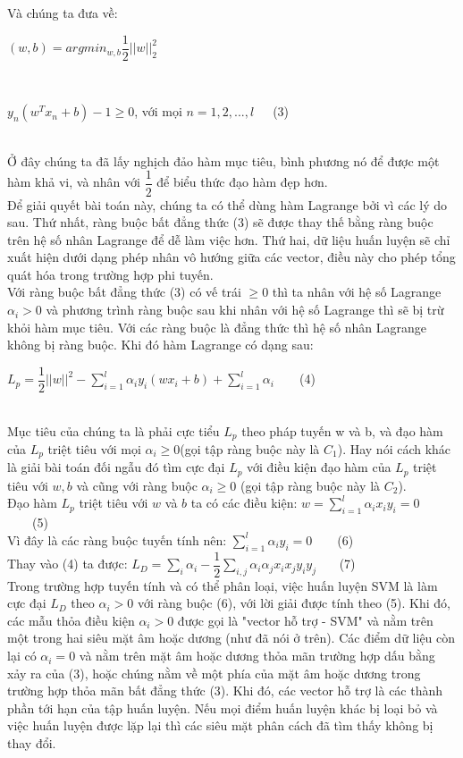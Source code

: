 \documentclass[12pt,a4paper]{article}
\begin{document}
Và chúng ta đưa về:\\
\centerline{$(w,b)=argmin_{w,b}\dfrac{1}{2}||w||^2_2$}\\
\centerline{$y_n(w^Tx_n+b) -1 \geq 0$, với mọi $n=1,2,...,l$\ \ \ (3)}\\
\indent Ở đây chúng ta đã lấy nghịch đảo hàm mục tiêu, bình phương nó để được một hàm khả vi, và nhân với $\dfrac{1}{2}$ để biểu thức đạo hàm đẹp hơn.\\
\indent Để giải quyết bài toán này, chúng ta có thể dùng hàm Lagrange bởi vì các lý do sau. Thứ nhất, ràng buộc bất đẳng thức (3) sẽ được thay thế bằng ràng buộc trên hệ số nhân Lagrange để dễ làm việc hơn. Thứ hai, dữ liệu huấn luyện sẽ chỉ xuất hiện dưới dạng phép nhân vô hướng giữa các vector, điều này cho phép tổng quát hóa trong trường hợp phi tuyến.\\
Với ràng buộc bất đẳng thức (3) có vế trái $\geq 0 $ thì ta nhân với hệ số Lagrange $\alpha_i > 0$ và phương trình ràng buộc sau khi nhân với hệ số Lagrange thì sẽ bị trừ khỏi hàm mục tiêu. Với các ràng buộc là đẳng thức thì hệ số nhân Lagrange không bị ràng buộc. Khi đó hàm Lagrange có dạng sau:\\
\centerline{$L_p = \dfrac{1}{2} ||w||^2 - \sum_{i=1}^l \alpha_iy_i(wx_i+b)+\sum_{i=1}^l\alpha_i$\ \ \ \ (4)}\\
\indent Mục tiêu của chúng ta là phải cực tiểu $L_p$ theo pháp tuyến w và b, và đạo hàm của $L_p$ triệt tiêu với mọi $\alpha_i\geq0$(gọi tập ràng buộc này là $C_1$). Hay nói cách khác là giải bài toán đối ngẫu đó tìm cực đại $L_p$ với điều kiện đạo hàm của $L_p$ triệt tiêu với $w,b$ và cũng với ràng buộc $\alpha_i \geq 0$ (gọi tập ràng buộc này là $C_2$).\\
Đạo hàm $L_p$ triệt tiêu với $w$ và $b$ ta có các điều kiện: $w=\sum_{i=1}^l\alpha_ix_iy_i =0$\ \ \ \ (5)\\
Vì đây là các ràng buộc tuyến tính nên: $\sum_{i=1}^{l}\alpha_iy_i=0$\ \ \ \ (6) \\
Thay vào (4) ta được: $L_D = \sum_i \alpha_i - \dfrac{1}{2}\sum_{i,j}\alpha_i\alpha_jx_ix_jy_iy_j$ \ \ \ (7)\\
Trong trường hợp tuyến tính và có thể phân loại, việc huấn luyện SVM là làm cực đại $L_D$ theo $\alpha_i > 0$ với ràng buộc (6), với lời giải được tính theo (5). Khi đó, các mẫu thỏa điều kiện $\alpha_i > 0$ được gọi là "vector hỗ trợ - SVM" và nằm trên một trong hai siêu mặt âm hoặc dương (như đã nói ở trên). Các điểm dữ liệu còn lại có $\alpha_i=0$ và nằm trên mặt âm hoặc dương thỏa mãn trường hợp dấu bằng xảy ra của (3), hoặc chúng nằm về một phía của mặt âm hoặc dương trong trường hợp thỏa mãn bất đẳng thức (3). Khi đó, các vector hỗ trợ là các thành phần tới hạn của tập huấn luyện. Nếu mọi điểm huấn luyện khác bị loại bỏ và việc huấn luyện được lặp lại thì các siêu mặt phân cách đã tìm thấy không bị thay đổi.\\
\end{document}

